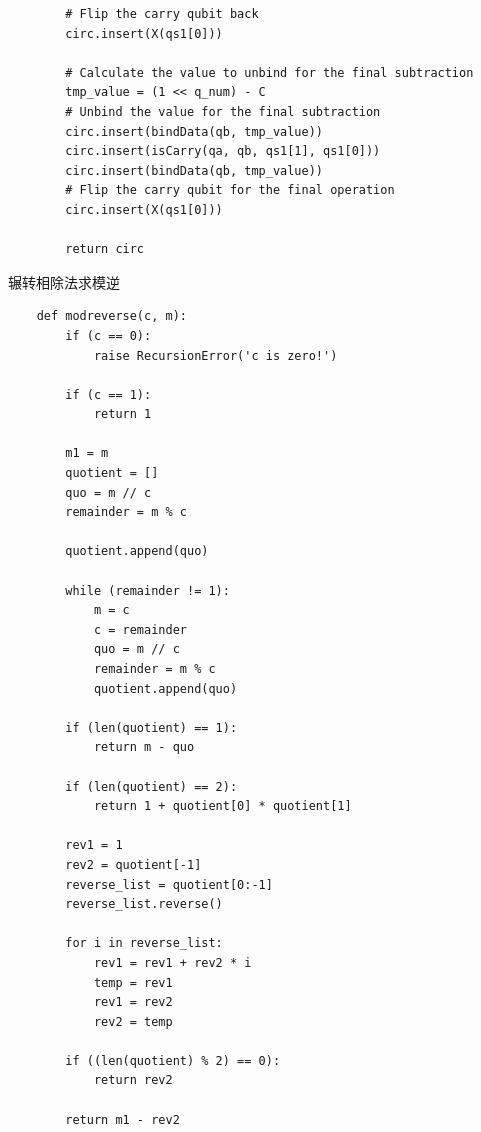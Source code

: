 \documentclass[12pt,hyperref,a4paper,UTF8]{ctexart}
\begin{document}
\begin{lstlisting}
        # Flip the carry qubit back
        circ.insert(X(qs1[0]))

        # Calculate the value to unbind for the final subtraction
        tmp_value = (1 << q_num) - C
        # Unbind the value for the final subtraction
        circ.insert(bindData(qb, tmp_value))
        circ.insert(isCarry(qa, qb, qs1[1], qs1[0]))
        circ.insert(bindData(qb, tmp_value))
        # Flip the carry qubit for the final operation
        circ.insert(X(qs1[0]))

        return circ
\end{lstlisting}

辗转相除法求模逆
\begin{lstlisting}
    def modreverse(c, m):
        if (c == 0):
            raise RecursionError('c is zero!')

        if (c == 1):
            return 1

        m1 = m
        quotient = []
        quo = m // c
        remainder = m % c

        quotient.append(quo)

        while (remainder != 1):
            m = c
            c = remainder
            quo = m // c
            remainder = m % c
            quotient.append(quo)

        if (len(quotient) == 1):
            return m - quo

        if (len(quotient) == 2):
            return 1 + quotient[0] * quotient[1]

        rev1 = 1
        rev2 = quotient[-1]
        reverse_list = quotient[0:-1]
        reverse_list.reverse()

        for i in reverse_list:
            rev1 = rev1 + rev2 * i
            temp = rev1
            rev1 = rev2
            rev2 = temp

        if ((len(quotient) % 2) == 0):
            return rev2

        return m1 - rev2
\end{lstlisting}
\end{document}
